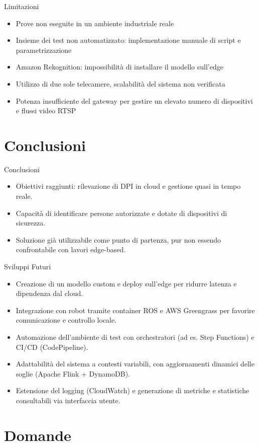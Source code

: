 \documentclass{beamer}
\begin{document}
\begin{frame}{Limitazioni}
\begin{itemize}
    \item Prove non eseguite in un ambiente industriale reale
    \item Insieme dei test non automatizzato: implementazione manuale di script e parametrizzazione
    \item Amazon Rekognition: impossibilità di installare il modello sull'edge
    \item Utilizzo di due sole telecamere, scalabilità del sistema non verificata
    \item Potenza insufficiente del gateway per gestire un elevato numero di dispositivi e flussi video RTSP
\end{itemize}
\end{frame}

\section{Conclusioni}

\begin{frame}{Conclusioni}
\begin{itemize}
    \item Obiettivi raggiunti: rilevazione di DPI in cloud e gestione quasi in tempo reale.
    \item Capacità di identificare persone autorizzate e dotate di dispositivi di sicurezza.
    \item Soluzione già utilizzabile come punto di partenza, pur non essendo confrontabile con lavori edge-based.
\end{itemize}
\end{frame}

\begin{frame}{Sviluppi Futuri}
\begin{itemize}
    \item Creazione di un modello custom e deploy sull’edge per ridurre latenza e dipendenza dal cloud.
    \item Integrazione con robot tramite container ROS e AWS Greengrass per favorire comunicazione e controllo locale.
    \item Automazione dell’ambiente di test con orchestratori (ad es. Step Functions) e CI/CD (CodePipeline).
    \item Adattabilità del sistema a contesti variabili, con aggiornamenti dinamici delle soglie (Apache Flink + DynamoDB).
    \item Estensione del logging (CloudWatch) e generazione di metriche e statistiche consultabili via interfaccia utente.
\end{itemize}
\end{frame}


\section*{Domande}

\backmatter
\end{document}
